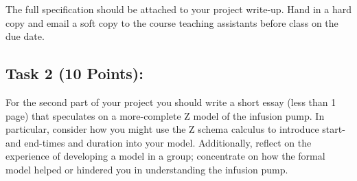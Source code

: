 \documentclass{article}
\newcommand{\head}{\subsection*}
\begin{document}
\noindent The full specification should be attached to your project
write-up. Hand in a hard copy and email a soft copy to the course
teaching assistants before class on the due date.

\head{Task 2 (10 Points):}

For the second part of your project you should write a short essay
(less than 1 page) that speculates on a more-complete Z model of the infusion pump. In particular, consider how you might use the Z schema calculus to introduce start- and end-times and duration into your model.
Additionally, reflect on the experience of developing a model in a
group; concentrate on how the formal model helped or hindered you in
understanding the infusion pump.
\end{document}
